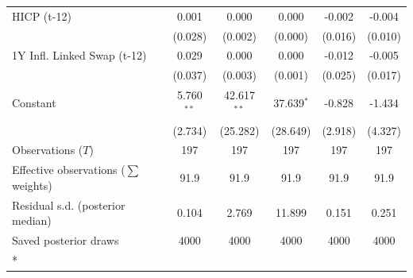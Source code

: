 \begin{longtable}[t]{lccccc}
HICP (t-12) & 0.001 & 0.000 & 0.000 & -0.002 & -0.004\\
 & (0.028) & (0.002) & (0.000) & (0.016) & (0.010)\\
1Y Infl. Linked Swap (t-12) & 0.029 & 0.000 & 0.000 & -0.012 & -0.005\\
 & (0.037) & (0.003) & (0.001) & (0.025) & (0.017)\\
Constant & 5.760$^{**}$ & 42.617$^{**}$ & 37.639$^{*}$ & -0.828 & -1.434\\
 & (2.734) & (25.282) & (28.649) & (2.918) & (4.327)\\
\midrule
Observations ($T$) & 197 & 197 & 197 & 197 & 197\\
Effective observations ($\sum$ weights) & 91.9 & 91.9 & 91.9 & 91.9 & 91.9\\
Residual s.d. (posterior median) & 0.104 & 2.769 & 11.899 & 0.151 & 0.251\\
Saved posterior draws & 4000 & 4000 & 4000 & 4000 & 4000\\*
\end{longtable}
\endgroup{}

\begingroup\fontsize{7}{9}\selectfont


